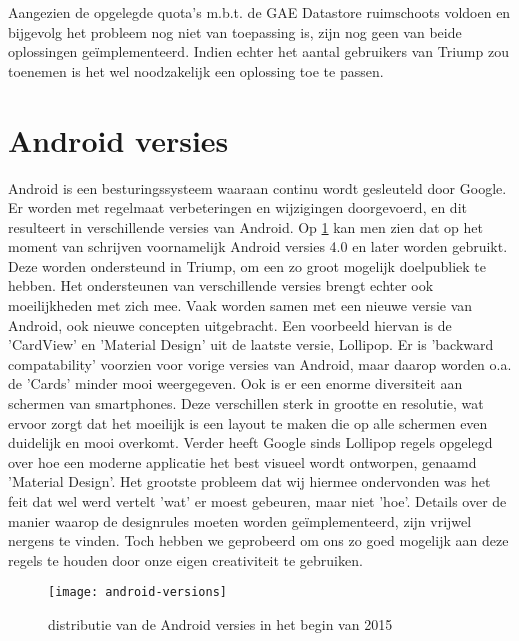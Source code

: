 Aangezien de opgelegde quota's m.b.t. de GAE Datastore ruimschoots voldoen en bijgevolg het probleem nog niet van toepassing is, zijn nog geen van beide oplossingen geïmplementeerd.
Indien echter het aantal gebruikers van Triump zou toenemen is het wel noodzakelijk een oplossing toe te passen.

\section{Android versies}

Android is een besturingssysteem waaraan continu wordt gesleuteld door Google. Er worden met regelmaat verbeteringen en wijzigingen doorgevoerd, en dit resulteert in verschillende versies van Android.
Op \ref{fig:android_versions} kan men zien dat op het moment van schrijven voornamelijk Android versies 4.0 en later worden gebruikt. Deze worden ondersteund in Triump, om een zo groot mogelijk doelpubliek te hebben. Het ondersteunen van verschillende versies brengt echter ook moeilijkheden met zich mee. Vaak worden samen met een nieuwe versie van Android, ook nieuwe concepten uitgebracht.
Een voorbeeld hiervan is de 'CardView' en 'Material Design' uit de laatste versie, Lollipop. Er is 'backward compatability' voorzien voor vorige versies van Android, maar daarop worden o.a. de 'Cards' minder mooi weergegeven.
Ook is er een enorme diversiteit aan schermen van smartphones. Deze verschillen sterk in grootte en resolutie, wat ervoor zorgt dat het moeilijk is een layout te maken die op alle schermen even duidelijk en mooi overkomt.
Verder heeft Google sinds Lollipop regels opgelegd over hoe een moderne applicatie het best visueel wordt ontworpen, genaamd 'Material Design'. Het grootste probleem dat wij hiermee ondervonden was het feit dat wel werd vertelt 'wat' er moest gebeuren, maar niet 'hoe'. Details over de manier waarop de designrules moeten worden geïmplementeerd, zijn vrijwel nergens te vinden. Toch hebben we geprobeerd om ons zo goed mogelijk aan deze regels te houden door onze eigen creativiteit te gebruiken.
\begin{figure}[H]
	\centering
	\texttt{[image: android-versions]}
	\caption{distributie van de Android versies in het begin van 2015}
	\label{fig:android_versions}
\end{figure}

